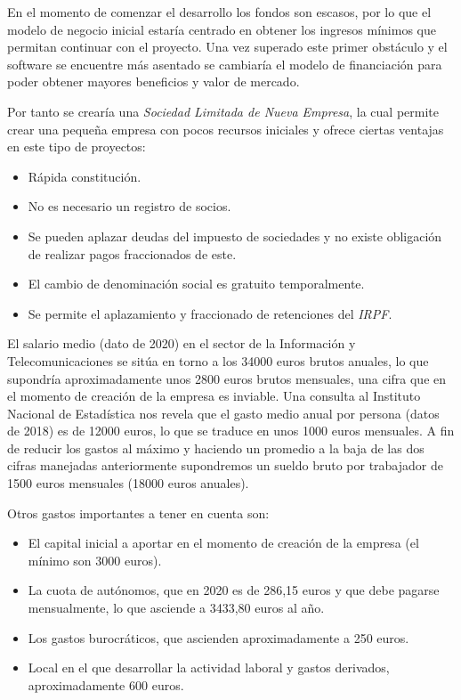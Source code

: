 En el momento de comenzar el desarrollo los fondos son escasos, por lo que el modelo de negocio inicial estaría centrado en obtener los ingresos mínimos que permitan continuar con el proyecto. Una vez superado este primer obstáculo y el software se encuentre más asentado se cambiaría el modelo de financiación para poder obtener mayores beneficios y valor de mercado.

Por tanto se crearía una \textit{Sociedad Limitada de Nueva Empresa}, la cual permite crear una pequeña empresa con pocos recursos iniciales y ofrece ciertas ventajas en este tipo de proyectos:

\begin{itemize}
	\item Rápida constitución.
	\item No es necesario un registro de socios.
	\item Se pueden aplazar deudas del impuesto de sociedades y no existe obligación de realizar pagos fraccionados de este.
	\item El cambio de denominación social es gratuito temporalmente.
	\item Se permite el aplazamiento y fraccionado de retenciones del \textit{IRPF}.
\end{itemize}

El salario medio (dato de 2020) en el sector de la Información y Telecomunicaciones se sitúa en torno a los 34000 euros brutos anuales, lo que supondría aproximadamente unos 2800 euros brutos mensuales, una cifra que en el momento de creación de la empresa es inviable. Una consulta al Instituto Nacional de Estadística nos revela que el gasto medio anual por persona (datos de 2018) es de 12000 euros, lo que se traduce en unos 1000 euros mensuales. A fin de reducir los gastos al máximo y haciendo un promedio a la baja de las dos cifras manejadas anteriormente supondremos un sueldo bruto por trabajador de 1500 euros mensuales (18000 euros anuales).

Otros gastos importantes a tener en cuenta son:
\begin{itemize}
	\item El capital inicial a aportar en el momento de creación de la empresa (el mínimo son 3000 euros).
	\item La cuota de autónomos, que en 2020 es de 286,15 euros y que debe pagarse mensualmente, lo que asciende a 3433,80 euros al año.
	\item Los gastos burocráticos, que ascienden aproximadamente a 250 euros.
	\item Local en el que desarrollar la actividad laboral y gastos derivados, aproximadamente 600 euros. 
\end{itemize}

